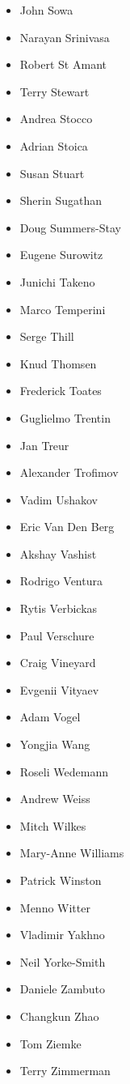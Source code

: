\documentclass[10pt,fleqn,openany]{book} %
\begin{document}
\begin{multicols}{2}
\begin{itemize}
			\item John Sowa
			\item Narayan Srinivasa
			\item Robert St Amant
			\item Terry Stewart
			\item Andrea Stocco
			\item Adrian Stoica
			\item Susan Stuart
			\item Sherin Sugathan
			\item Doug Summers-Stay
			\item Eugene Surowitz
			\item Junichi Takeno
			\item Marco Temperini
			\item Serge Thill
			\item Knud Thomsen
			\item Frederick Toates
			\item Guglielmo Trentin
			\item Jan Treur
			\item Alexander Trofimov
			\item Vadim Ushakov
			\item Eric Van Den Berg
			\item Akshay Vashist
			\item Rodrigo Ventura
			\item Rytis Verbickas
			\item Paul Verschure
			\item Craig Vineyard
			\item Evgenii Vityaev
			\item Adam Vogel
			\item Yongjia Wang
			\item Roseli Wedemann
			\item Andrew Weiss
			\item Mitch Wilkes
			\item Mary-Anne Williams
			\item Patrick Winston
			\item Menno Witter
			\item Vladimir Yakhno
			\item Neil Yorke-Smith
			\item Daniele Zambuto
			\item Changkun Zhao
			\item Tom Ziemke
			\item Terry Zimmerman
		\end{itemize}
	\end{multicols}
\end{document}
